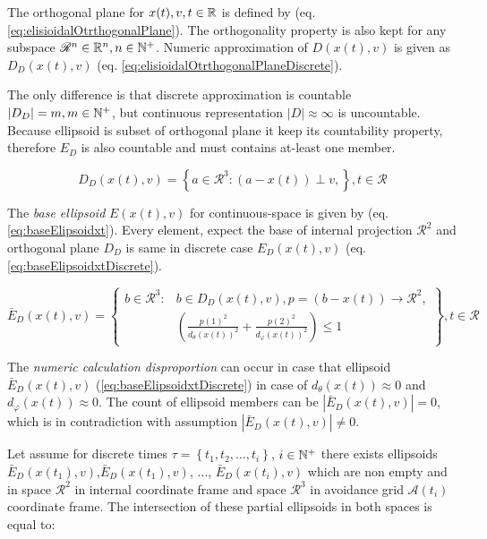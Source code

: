 \noindent The orthogonal plane for ${x}(t), {v}, t \in\mathbb{R}$ is defined by (eq. \ref{eq:elisioidalOtrthogonalPlane}). The orthogonality property is also kept for any subspace $\mathscr{R}^n\in\mathbb{R}^n,n\in\mathbb{N}^+$. Numeric approximation of $D({x}(t),{v})$ is given as $D_D({x}(t),{v})$ (eq. \ref{eq:elisioidalOtrthogonalPlaneDiscrete}). 

The only difference is that discrete approximation is countable $|D_D|=m,m\in\mathbb{N}^+$, but continuous representation $|D|\approx \infty$ is uncountable. Because ellipsoid is subset of orthogonal plane it keep its countability property, therefore $E_D$ is also countable and must contains at-least one member.

\begin{equation}\label{eq:elisioidalOtrthogonalPlaneDiscrete}
    D_D({x}(t),{v})=\left\{{a}\in\mathscr{R}^3:({a}-{x}(t))\perp{v},\right\},t\in\mathscr{R}
\end{equation}

\noindent The \emph{base ellipsoid} $E({x}(t),{v})$ for continuous-space is given by (eq. \ref{eq:baseElipsoidxt}). Every element, expect the base of internal projection $\mathscr{R}^2$ and orthogonal plane $D_D$ is same in discrete case $E_D({x}(t),{v})$ (eq. \ref{eq:baseElipsoidxtDiscrete}).

\begin{equation}\label{eq:baseElipsoidxtDiscrete}
    \bar{E}_D({x}(t),{v})=\left\{ \begin{aligned}{b}\in\mathscr{R}^3:&{b}\in D_D({x}(t),{v}),{p}=({b}-{x}(t))\to\mathscr{R}^2,\\&\left(\frac{p(1)^2} {d_\theta({x}(t))^2}+ \frac{p(2)^2}{d_\varphi({x}(t))^2}\right)\le 1\end{aligned}\right\},t\in\mathscr{R}
\end{equation}

\noindent The \emph{numeric calculation disproportion} can occur in case that ellipsoid $\bar{E}_D({x}(t),{v})$ (\ref{eq:baseElipsoidxtDiscrete}) in case of $d_\theta({x}(t))\approx 0$ and $d_\varphi({x}(t))\approx 0$. The count of ellipsoid members can be $|\bar{E}_D({x}(t),{v})|=0$, which is in contradiction with assumption $|\bar{E}_D({x}(t),{v})|\neq 0$. 

Let assume for discrete times $\tau=\left\{t_1,t_2,\dots,t_i\right\}$, $i\in \mathbb{N}^+$ there exists ellipsoids $\bar{E}_D({x}(t_1),{v})$,$\bar{E}_D({x}(t_1),{v})$, $\dots$, $\bar{E}_D({x}(t_i),{v})$ which are non empty and in space $\mathscr{R}^2$ in internal coordinate frame and space $\mathscr{R}^3$ in avoidance grid $\mathscr{A}(t_i)$ coordinate frame. The intersection of these partial ellipsoids in both spaces is equal to:

